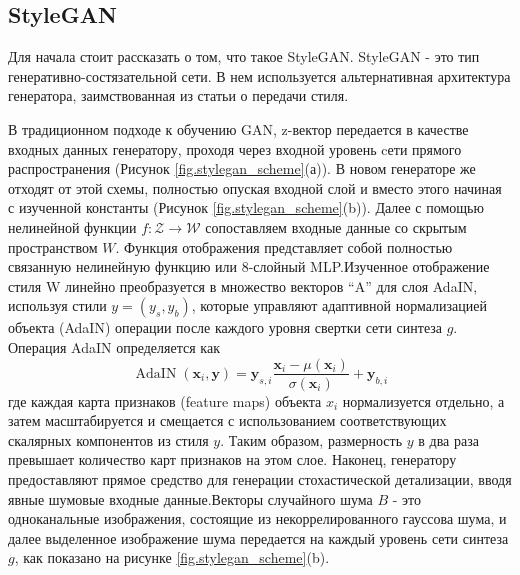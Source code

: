 \subsection{StyleGAN}
Для начала стоит рассказать о том, что такое StyleGAN. StyleGAN - это тип генеративно-состязательной сети. В нем используется альтернативная архитектура генератора, заимствованная из статьи о передачи стиля. \cite{styletransfer}

В традиционном подходе к обучению GAN, z-вектор передается в качестве входных данных генератору, проходя через входной уровень cети прямого распространения (Рисунок {\color{blue} \ref{fig.stylegan_scheme}}(а)). В новом генераторе же отходят от этой схемы, полностью опуская входной слой и вместо этого начиная с изученной константы (Рисунок {\color{blue} \ref{fig.stylegan_scheme}}(b)). Далее с помощью нелинейной функции $f : \mathcal{Z} \rightarrow \mathcal{W}$ сопоставляем входные данные со скрытым пространством $W$. Функция отображения представляет собой полностью связанную нелинейную функцию или 8-слойный MLP.Изученное отображение стиля W линейно преобразуется в множество векторов “A” для слоя AdaIN, используя стили $y = (y_s, y_b)$, которые управляют адаптивной нормализацией объекта (AdaIN) операции после каждого уровня свертки сети синтеза $g$. Операция AdaIN определяется как
\begin{equation}
    \operatorname{AdaIN}\left(\mathbf{x}_{i}, \mathbf{y}\right)=\mathbf{y}_{s, i} \frac{\mathbf{x}_{i}-\mu\left(\mathbf{x}_{i}\right)}{\sigma\left(\mathbf{x}_{i}\right)}+\mathbf{y}_{b, i}
\end{equation}
где каждая карта признаков (feature maps) объекта $x_i$ нормализуется отдельно, а затем масштабируется и смещается с использованием соответствующих скалярных компонентов из стиля $y$. Таким образом, размерность $y$ в два раза превышает количество карт признаков на этом слое. Наконец, генератору предоставляют прямое средство для генерации стохастической детализации, вводя явные шумовые входные данные.Векторы случайного шума $B$ - это одноканальные изображения, состоящие из некоррелированного гауссова шума, и далее выделенное изображение шума передается на каждый уровень сети синтеза $g$, как показано на рисунке {\color{blue} \ref{fig.stylegan_scheme}}(b)\cite{StyleGAN}.

